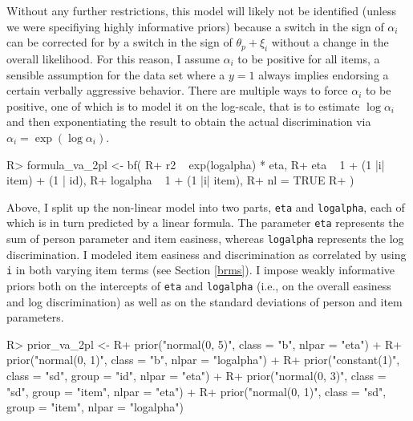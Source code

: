 \documentclass[
]{jss}
\begin{document}
Without any further restrictions, this model will likely not be
identified (unless we were specifiying highly informative priors)
because a switch in the sign of \(\alpha_i\) can be corrected for by a
switch in the sign of \(\theta_p + \xi_i\) without a change in the
overall likelihood. For this reason, I assume \(\alpha_i\) to be
positive for all items, a sensible assumption for the 
data set where a \(y = 1\) always implies endorsing a certain verbally
aggressive behavior. There are multiple ways to force \(\alpha_i\) to be
positive, one of which is to model it on the log-scale, that is to
estimate \(\log \alpha_i\) and then exponentiating the result to obtain
the actual discrimination via \(\alpha_i = \exp(\log \alpha_i)\).

\begin{CodeChunk}

\begin{CodeInput}
R> formula_va_2pl <- bf(
R+   r2 ~ exp(logalpha) * eta,
R+   eta ~ 1 + (1 |i| item) + (1 | id),
R+   logalpha ~ 1 + (1 |i| item),
R+   nl = TRUE
R+ )
\end{CodeInput}
\end{CodeChunk}

Above, I split up the non-linear model into two parts, \texttt{eta} and
\texttt{logalpha}, each of which is in turn predicted by a linear
formula. The parameter \texttt{eta} represents the sum of person
parameter and item easiness, whereas \texttt{logalpha} represents the
log discrimination. I modeled item easiness and discrimination as
correlated by using \texttt{\textbar{}i\textbar{}} in both varying item
terms (see Section \ref{brms}). I impose weakly informative priors both
on the intercepts of \texttt{eta} and \texttt{logalpha} (i.e., on the
overall easiness and log discrimination) as well as on the standard
deviations of person and item parameters.

\begin{CodeChunk}

\begin{CodeInput}
R> prior_va_2pl <- 
R+   prior("normal(0, 5)", class = "b", nlpar = "eta") +
R+   prior("normal(0, 1)", class = "b", nlpar = "logalpha") +
R+   prior("constant(1)", class = "sd", group = "id", nlpar = "eta") + 
R+   prior("normal(0, 3)", class = "sd", group = "item", nlpar = "eta") +
R+   prior("normal(0, 1)", class = "sd", group = "item", nlpar = "logalpha")
\end{CodeInput}
\end{CodeChunk}
\end{document}
